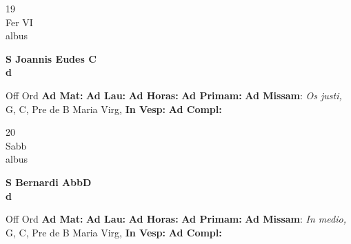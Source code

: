 \documentclass[10pt, openany]{book}
\begin{document}
        \begin{center}
            \begin{minipage}{3.5in}
                \vspace{2em}
                \begin{minipage}{0.5in}
                    {\Huge 19} \\
                    {\normalsize Fer VI} \\
                    {\normalsize albus}
                \end{minipage}
                \begin{minipage}{3.0in}
                    \textbf{ \large S Joannis Eudes C \\
                    \textnormal{\normalsize d}} \\ 
                \end{minipage}
                \begin{justify}Off Ord
                    \textbf{Ad Mat: }
                    \textbf{Ad Lau: }
                    \textbf{Ad Horas: }
                    \textbf{Ad Primam: }\textbf{Ad Missam}: \textit{Os justi,} G, C, Pre de B Maria Virg,  
                    \textbf{In Vesp: }
                    \textbf{Ad Compl: }
                \end{justify}
            \end{minipage}
        \end{center}
    
        \begin{center}
            \begin{minipage}{3.5in}
                \vspace{2em}
                \begin{minipage}{0.5in}
                    {\Huge 20} \\
                    {\normalsize Sabb} \\
                    {\normalsize albus}
                \end{minipage}
                \begin{minipage}{3.0in}
                    \textbf{ \large S Bernardi AbbD \\
                    \textnormal{\normalsize d}} \\ 
                \end{minipage}
                \begin{justify}Off Ord
                    \textbf{Ad Mat: }
                    \textbf{Ad Lau: }
                    \textbf{Ad Horas: }
                    \textbf{Ad Primam: }\textbf{Ad Missam}: \textit{In medio,} G, C, Pre de B Maria Virg,  
                    \textbf{In Vesp: }
                    \textbf{Ad Compl: }
                \end{justify}
            \end{minipage}
        \end{center}
    
\end{document}
